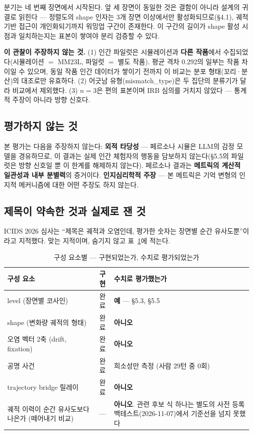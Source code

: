 \documentclass[11pt, a4paper]{article}
\begin{document}
분기는 네 번째 장면에서 시작된다. 앞 세 장면이 동일한 것은 결함이 아니라 설계의 귀결로 읽힌다 --- 정렬도의 shape 인자는 3개 장면 이상에서만 활성화되므로(\S4.1), 궤적 기반 접근이 개인화되기까지 워밍업 구간이 존재한다. 이 구간의 길이가 shape 활성 시점과 일치하는지는 표본이 쌓여야 분리 검증할 수 있다.

\textbf{이 관찰이 주장하지 않는 것.} (1) 인간 파일럿은 시뮬레이션과 \textbf{다른 작품}에서 수집되었다(시뮬레이션 $=$ MM23L, 파일럿 $=$ 별도 작품). 평균 격차 0.292의 일부는 작품 차이일 수 있으며, 동일 작품 인간 데이터가 쌓이기 전까지 이 비교는 분포 형태(꼬리·분산)의 대조로만 유효하다. (2) 어긋남 유형(mismatch\_type)은 두 집단의 분류기가 달라 비교에서 제외했다. (3) $n=3$은 편의 표본이며 IRB 심의를 거치지 않았다 --- 통계적 주장이 아니라 방향 신호다.

\subsection{평가하지 않는 것}
본 평가는 다음을 주장하지 않는다: \textbf{외적 타당성} --- 페르소나 시뮬은 LLM의 감정 모델을 경유하므로, 이 결과는 실제 인간 체험자의 행동을 담보하지 않는다(\S5.5의 파일럿은 방향 신호일 뿐 이 한계를 해제하지 않는다). 페르소나 결과는 \textbf{메트릭의 계산적 일관성과 내부 분별력}의 증거이다. \textbf{인지심리학적 주장} --- 본 메트릭은 기억 변형의 인지적 메커니즘에 대한 어떤 주장도 하지 않는다.

\subsection{제목이 약속한 것과 실제로 잰 것}

ICIDS 2026 심사는 ``제목은 궤적과 오염인데, 평가한 숫자는 장면별 순간 유사도뿐''이라고 지적했다. 맞는 지적이며, 숨기지 않고 표~\ref{tab:gap}에 적는다.

\begin{table}[H]
\centering
\caption{구성 요소별 --- 구현되었는가, 수치로 평가되었는가}
\label{tab:gap}
\small
\begin{tabular}{p{5.4cm} c p{6.6cm}}
\toprule
\textbf{구성 요소} & \textbf{구현} & \textbf{수치로 평가했는가} \\
\midrule
level (장면별 코사인) & 완료 & \textbf{예} --- \S5.3, \S5.5 \\
shape (변화량 궤적의 형태) & 완료 & \textbf{아니오} \\
오염 벡터 2축 (drift, fixation) & 완료 & \textbf{아니오} \\
공명 사건 & 완료 & 희소성만 측정 (사람 29턴 중 0회) \\
trajectory bridge 릴레이 & 완료 & \textbf{아니오} \\
궤적 이력이 순간 유사도보다 나은가 (떼어내기 비교) & --- & \textbf{아니오}. 관련 후보 식 하나는 별도의 사전 등록 백테스트(2026-11-07)에서 기준선을 넘지 못했다 \\
\bottomrule
\end{tabular}
\end{table}
\end{document}

